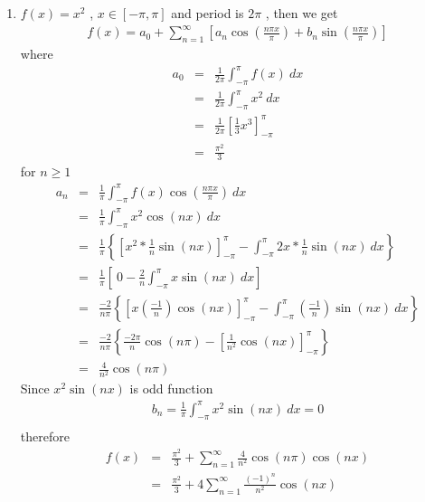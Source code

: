 \documentclass[12pt]{article}
\begin{document}
\begin{enumerate}
	\item %
		$f(x)=x^2$ , $x \in [-\pi,\pi]$	and period is $2\pi$ , then we get
		\begin{eqnarray*}
			f(x) = a_0 + \sum_{n=1}^{\infty}\left[a_n\cos\left(\frac{n\pi x}{\pi}\right)+b_n\sin\left(\frac{n\pi x}{\pi}\right)\right]
		\end{eqnarray*}
		where
		\begin{eqnarray*}
			a_0 &=& \frac{1}{2\pi}\int_{-\pi}^{\pi}f(x)~dx\\
				&=& \frac{1}{2\pi}\int_{-\pi}^{\pi}x^2~dx\\
				&=& \frac{1}{2\pi}\left[ \frac{1}{3}x^3 \right]_{-\pi}^{\pi}\\
				&=& \frac{\pi ^2}{3}
		\end{eqnarray*}		
		for $n \geq 1$
		\begin{eqnarray*}
			a_n &=& \frac{1}{\pi}\int_{-\pi}^{\pi}f(x)\cos\left(\frac{n\pi x}{\pi}\right)~dx\\
				&=& \frac{1}{\pi}\int_{-\pi}^{\pi}x^2\cos(nx)~dx\\
				&=& \frac{1}{\pi}\left\{ \left[ x^2*\frac{1}{n}\sin(nx) \right]_{-\pi}^{\pi} - \int_{-\pi}^{\pi}2x*\frac{1}{n}\sin(nx)~dx \right\}\\
				&=& \frac{1}{\pi}\left[~0-\frac{2}{n}\int_{-\pi}^{\pi}x\sin(nx)~dx \right]\\
				&=& \frac{-2}{n\pi}\left\{ \left[x(\frac{-1}{n})\cos(nx)\right]_{-\pi}^{\pi} - \int_{-\pi}^{\pi}(\frac{-1}{n})\sin(nx)~dx \right\}\\
				&=& \frac{-2}{n\pi}\left\{\frac{-2\pi}{n}\cos(n\pi)- \left[\frac{1}{n^2}\cos(nx)\right]_{-\pi}^{\pi}\right\}\\
				&=& \frac{4}{n^2}\cos(n\pi)
		\end{eqnarray*}	
		Since $x^2\sin(nx)$ is odd function
		\begin{eqnarray*}
			b_n = \frac{1}{\pi}\int_{-\pi}^{\pi}x^2\sin(nx)~dx = 0\\
		\end{eqnarray*}
		therefore 
		\begin{eqnarray*}
			f(x) &=& \frac{\pi ^2}{3} + \sum_{n=1}^{\infty}\frac{4}{n^2}\cos(n\pi)\cos(nx)\\
				&=& \frac{\pi^2}{3}+4\sum_{n=1}^{\infty}\frac{(-1)^n}{n^2}\cos(nx)
		\end{eqnarray*}
		

\end{enumerate}
\end{document}
